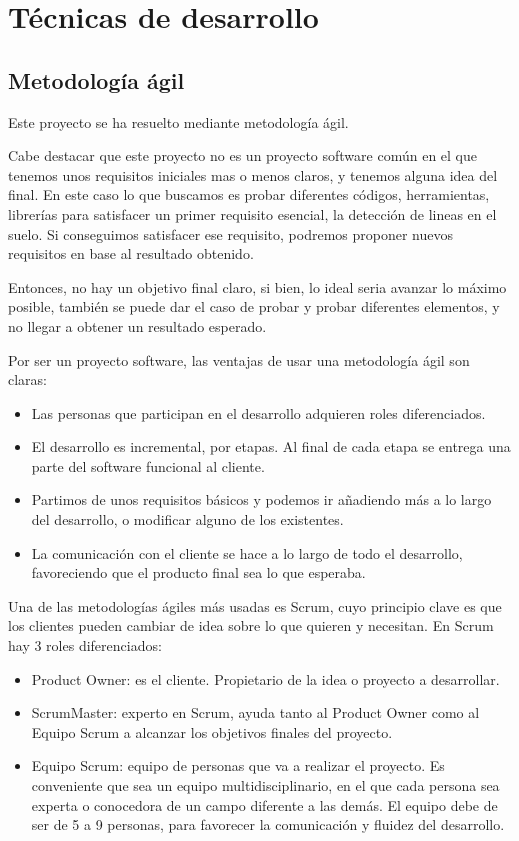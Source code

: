 
\section{Técnicas de desarrollo}

\subsection{Metodología ágil}

Este proyecto se ha resuelto mediante metodología ágil. 

Cabe destacar que este proyecto no es un proyecto software común en el que tenemos unos requisitos iniciales mas o menos claros, y tenemos alguna idea del final. En este caso lo que buscamos es probar diferentes códigos, herramientas, librerías para satisfacer un primer requisito esencial, la detección de lineas en el suelo. Si conseguimos satisfacer ese requisito, podremos proponer nuevos requisitos en base al resultado obtenido.

Entonces, no hay un objetivo final claro, si bien, lo ideal seria avanzar lo máximo posible, también se puede dar el caso de probar y probar diferentes elementos, y no llegar a obtener un resultado esperado.

Por ser un proyecto software, las ventajas de usar una metodología ágil son claras:
\begin{itemize}
	\item Las personas que participan en el desarrollo adquieren roles diferenciados.
	\item El desarrollo es incremental, por etapas. Al final de cada etapa se entrega una parte del software funcional al cliente.
	\item Partimos de unos requisitos básicos y podemos ir añadiendo más a lo largo del desarrollo, o modificar alguno de los existentes.
	\item La comunicación con el cliente se hace a lo largo de todo el desarrollo, favoreciendo que el producto final sea lo que esperaba.
\end{itemize}

Una de las metodologías ágiles más usadas es Scrum, cuyo principio clave es que los clientes pueden cambiar de idea sobre lo que quieren y necesitan. 
En Scrum hay 3 roles diferenciados:
\begin{itemize}
	\item Product Owner: es el cliente. Propietario de la idea o proyecto a desarrollar. 
	\item ScrumMaster: experto en Scrum, ayuda tanto al Product Owner como al Equipo Scrum a alcanzar los objetivos finales del proyecto.
	\item Equipo Scrum: equipo de personas que va a realizar el proyecto. Es conveniente que sea un equipo multidisciplinario, en el que cada persona sea experta o conocedora de un campo diferente a las demás. El equipo debe de ser de 5 a 9 personas, para favorecer la comunicación y fluidez del desarrollo.
\end{itemize}

